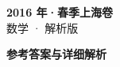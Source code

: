 \documentclass[zihao=-4, a4paper]{ctexart}
\begin{document}
\begin{center}
  {\Large\bfseries 2016 年·春季上海卷}\\[4pt]
  {\large 数学 · 解析版}
\end{center}
\medskip
{}

\clearpage
{}
\begin{center}{\Large\bfseries 参考答案与详细解析}\end{center}
\medskip

\end{document}
